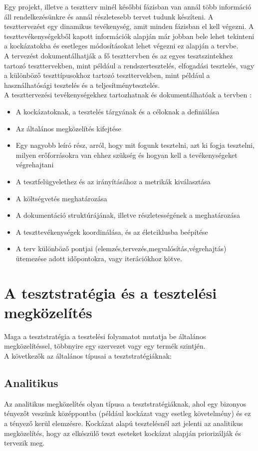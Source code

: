 Egy projekt, illetve a tesztterv minél későbbi fázisban van annál több információ áll rendelkezésünkre és annál részletesebb tervet tudunk készíteni. A teszttervezést egy dinamikus tevékenység, amit minden fázisban el kell végezni. A teszttevékenységekből kapott információk alapján már jobban bele lehet tekinteni a kockázatokba és esetleges módosításokat lehet végezni ez alapján a tervbe.\\
A tervezést dokumentálhatják a fő teszttervben és az egyes tesztszintekhez tartozó teszttervekben, mint például a rendszertesztelés, elfogadási tesztelés, vagy a különböző teszttípusokhoz tartozó teszttervekben, mint például a használhatósági tesztelés és a teljesítménytesztelés\cite{syllabus3}.\\
A teszttervezési tevékenységekhez tartozhatnak és dokumentálhatóak a tervben :
\begin{itemize}
\item A kockázatoknak, a tesztelés tárgyának és a céloknak a definiálása
\item Az általános megközelítés kifejtése
\item Egy nagyobb leíró rész, arról, hogy mit fogunk tesztelni, azt ki fogja tesztelni, milyen erőforrásokra van ehhez szükség és hogyan kell a tevékenységeket végrehajtani
\item A tesztfelügyelethez és az irányításához a metrikák kiválasztása
\item A költségvetés meghatározása
\item A dokumentáció struktúrájának, illetve részletességének a meghatározása
\item A teszttevékenységek koordinálása, és az életciklusba beépítése
\item A terv különböző pontjai (elemzés,tervezés,megvalósítás,végrehajtás) ütemezése adott időpontokra, vagy iterációkhoz kötve.
\end{itemize}

\section {A tesztstratégia és a tesztelési megközelítés}

Maga a tesztstratégia a tesztelési folyamatot mutatja be általános megközelítéssel, többnyire egy szervezet vagy egy termék szintjén.\\
A következők az általános típusai a tesztstratégiáknak:
\subsection{Analitikus} Az analitikus megközelítés olyan típusa a tesztstratégiáknak, ahol egy bizonyos tényezőt veszünk középpontba (például kockázat vagy esetleg követelmény) és ez a tényező kerül elemzésre.
Kockázat alapú tesztelésnél azt jelenti az analitikus megközelítés, hogy az elkészülő teszt eseteket kockázat alapján priorizálják és tervezik meg.


